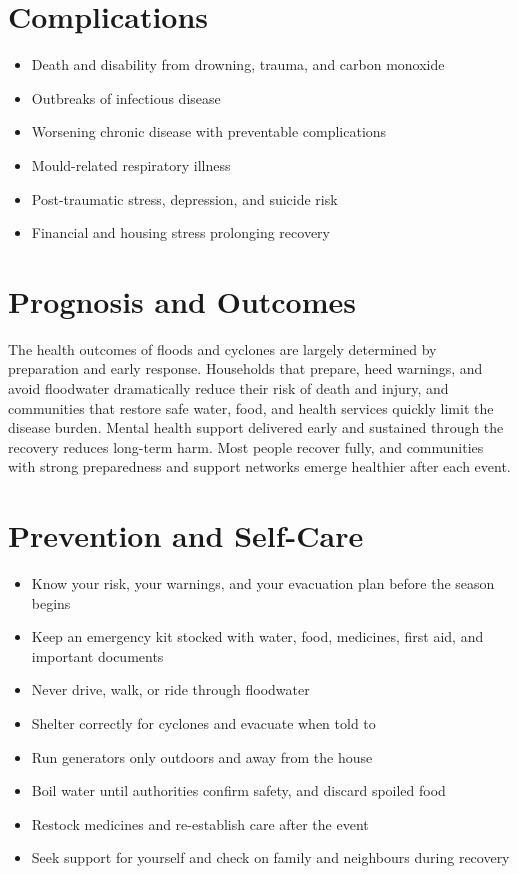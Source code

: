 \section*{Complications}
\begin{itemize}
    \item Death and disability from drowning, trauma, and carbon monoxide
    \item Outbreaks of infectious disease
    \item Worsening chronic disease with preventable complications
    \item Mould-related respiratory illness
    \item Post-traumatic stress, depression, and suicide risk
    \item Financial and housing stress prolonging recovery
\end{itemize}

\section*{Prognosis and Outcomes}
The health outcomes of floods and cyclones are largely determined by preparation and early response. Households that prepare, heed warnings, and avoid floodwater dramatically reduce their risk of death and injury, and communities that restore safe water, food, and health services quickly limit the disease burden. Mental health support delivered early and sustained through the recovery reduces long-term harm. Most people recover fully, and communities with strong preparedness and support networks emerge healthier after each event.

\section*{Prevention and Self-Care}
\begin{itemize}
    \item Know your risk, your warnings, and your evacuation plan before the season begins
    \item Keep an emergency kit stocked with water, food, medicines, first aid, and important documents
    \item Never drive, walk, or ride through floodwater
    \item Shelter correctly for cyclones and evacuate when told to
    \item Run generators only outdoors and away from the house
    \item Boil water until authorities confirm safety, and discard spoiled food
    \item Restock medicines and re-establish care after the event
    \item Seek support for yourself and check on family and neighbours during recovery
\end{itemize}

